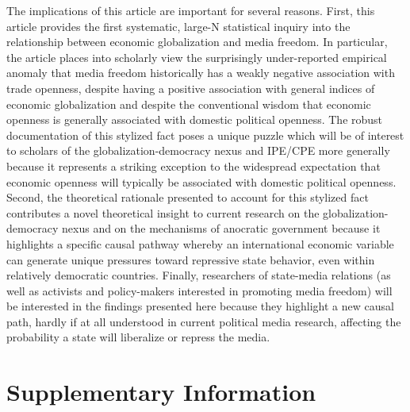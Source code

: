 \documentclass[12pt,a4paper]{article}\usepackage[]{graphicx}\usepackage[]{color}
\begin{document}
The implications of this article are important for several reasons. First, this article provides the first systematic, large-N statistical inquiry into the relationship between economic globalization and media freedom. In particular, the article places into scholarly view the surprisingly under-reported empirical anomaly that media freedom historically has a weakly negative association with trade openness, despite having a positive association with general indices of economic globalization and despite the conventional wisdom that economic openness is generally associated with domestic political openness. The robust documentation of this stylized fact poses a unique puzzle which will be of interest to scholars of the globalization-democracy nexus and IPE/CPE more generally because it represents a striking exception to the widespread expectation that economic openness will typically be associated with domestic political openness. Second, the theoretical rationale presented to account for this stylized fact contributes a novel theoretical insight to current research on the globalization-democracy nexus and on the mechanisms of anocratic government because it highlights a specific causal pathway whereby an international economic variable can generate unique pressures toward repressive state behavior, even within relatively democratic countries. Finally,
researchers of state-media relations (as well as activists and policy-makers interested in promoting media freedom) will be interested in the findings presented here because they highlight a new causal path, hardly if at all understood in current political media research, affecting the probability a state will liberalize or repress the media.


\clearpage

\section{Supplementary Information}
\end{document}
